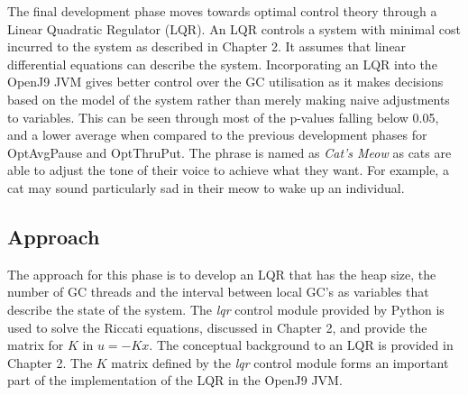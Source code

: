 The final development phase moves towards optimal control theory through
a Linear Quadratic Regulator (LQR). An LQR controls a system with minimal cost incurred to the system as described in
Chapter 2. It assumes that linear differential equations can describe
the system. Incorporating an LQR into the OpenJ9 JVM gives better
control over the GC utilisation as it makes decisions based on the model
of the system rather than merely making naive adjustments to variables.
This can be seen through most of the p-values falling below 0.05, and a
lower average when compared to the previous development phases for
OptAvgPause and OptThruPut.
\newline\newline
The phrase is named as \emph{Cat's Meow} as cats are able to adjust the tone of
their voice to achieve what they want. For example, a cat may sound
particularly sad in their meow to wake up an individual.

\subsection{Approach}
The approach for this phase is to develop an LQR that has the heap size, the
number of GC threads and the interval between local GC's as variables
that describe the state of the system. The \emph{lqr} control module provided
by Python is used to solve the Riccati equations, discussed in Chapter 2, and provide the matrix
for $K$ in $u = -Kx$. The conceptual background to an LQR is provided in
Chapter 2. The $K$ matrix defined by the \emph{lqr} control module forms an important part of the implementation of the LQR in the OpenJ9 JVM. 

